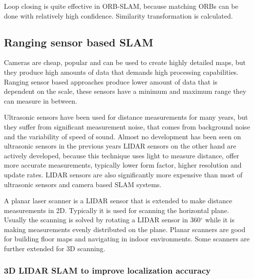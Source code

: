 Loop closing is quite effective in ORB-SLAM, because matching ORBs can be done with relatively high confidence.
Similarity transformation is calculated.

\subsection{Ranging sensor based SLAM}
Cameras are cheap, popular and can be used to create highly detailed maps, but they produce high amounts of data that demands 
high processing capabilities. Ranging sensor based approaches produce lower amount of data that is dependent on the scale, these 
sensors have a minimum and maximum range they can measure in between.

Ultrasonic sensors have been used for distance measurements for many years, but they suffer from significant
measurement noise, that comes from background noise and the variability of speed of sound. Almost no development has been seen on
ultrasonic sensors in the previous years LIDAR sensors on the other hand are actively developed, because this technique
uses light to measure distance, offer more accurate measurements, typically lower form factor, higher resolution and update rates. 
LIDAR sensors are also significantly more expensive than most of ultrasonic sensors and camera based SLAM systems.

A planar laser scanner is a LIDAR sensor that is extended to make distance measurements in 2D. Typically it is used for 
scanning the horizontal plane. Usually the scanning is solved by rotating a LIDAR sensor in 360$^\circ$ while it is 
making measurements evenly distributed on the plane. Planar scanners are good for building floor maps and navigating in indoor 
environments. Some scanners are further extended for 3D scanning.


\subsubsection{3D LIDAR SLAM to improve localization accuracy} \label{lidar_for_localization}

